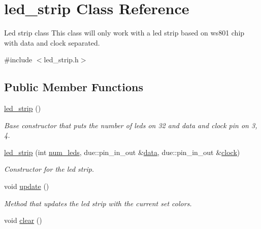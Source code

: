 \hypertarget{classled__strip}{}\section{led\+\_\+strip Class Reference}
\label{classled__strip}


Led strip class This class will only work with a led strip based on ws801 chip with data and clock separated.  




{\ttfamily \#include $<$led\+\_\+strip.\+h$>$}

\subsection*{Public Member Functions}
\begin{DoxyCompactItemize}
\item 
\hyperlink{classled__strip_aba43c99ee0ccb5523acc42cf977fa0dc}{led\+\_\+strip} ()\hypertarget{classled__strip_aba43c99ee0ccb5523acc42cf977fa0dc}{}\label{classled__strip_aba43c99ee0ccb5523acc42cf977fa0dc}

\begin{DoxyCompactList}\small\item\em Base constructor that puts the number of leds on 32 and data and clock pin on 3, 4. \end{DoxyCompactList}\item 
\hyperlink{classled__strip_a4d3d7642deeb488441ba3c48321572d1}{led\+\_\+strip} (int \hyperlink{classled__strip_a2ea7f1f40f296c61d2eb93d3e1b45436}{num\+\_\+leds}, due\+::pin\+\_\+in\+\_\+out \&\hyperlink{classled__strip_ac06ac086bc492b8b90d4bdec5a1665e7}{data}, due\+::pin\+\_\+in\+\_\+out \&\hyperlink{classled__strip_a9114ec90b6a38eb93b360f38ffef1f04}{clock})
\begin{DoxyCompactList}\small\item\em Constructor for the led strip. \end{DoxyCompactList}\item 
void \hyperlink{classled__strip_a00573e13bf5d111fe9a8c5b5fde5a0ac}{update} ()\hypertarget{classled__strip_a00573e13bf5d111fe9a8c5b5fde5a0ac}{}\label{classled__strip_a00573e13bf5d111fe9a8c5b5fde5a0ac}

\begin{DoxyCompactList}\small\item\em Method that updates the led strip with the current set colors. \end{DoxyCompactList}\item 
void \hyperlink{classled__strip_a044db3bc3f36719270115199896d2225}{clear} ()\hypertarget{classled__strip_a044db3bc3f36719270115199896d2225}{}\label{classled__strip_a044db3bc3f36719270115199896d2225}


\end{DoxyCompactItemize}
